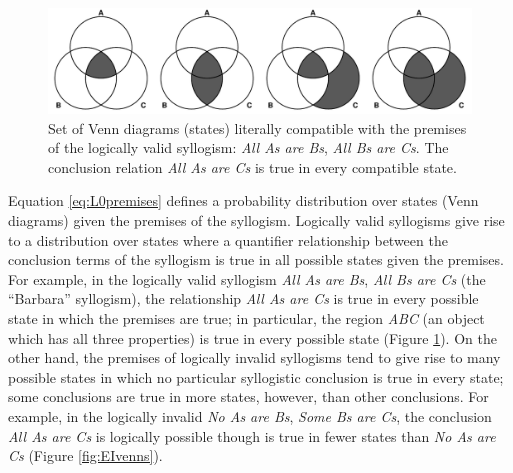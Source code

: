 \documentclass[floatsintext, doc]{apa6}
\begin{document}

\begin{figure}[b]
\centering
\includegraphics[width = \textwidth]{figs/diagrams_allAB_allBC.pdf}
\caption{Set of Venn diagrams (states) literally compatible with the premises of the logically valid syllogism: \emph{All As are Bs}, \emph{All Bs are Cs}. The conclusion relation \emph{All As are Cs} is true in every compatible state.}
\label{fig:AAvenns}
\end{figure}


Equation \ref{eq:L0premises} defines a probability distribution over states (Venn diagrams) given the premises of the syllogism. 
Logically valid syllogisms give rise to a distribution over states where a quantifier relationship between the conclusion terms of the syllogism is true in all possible states given the premises. 
For example, in the logically valid syllogism  \emph{All As are Bs}, \emph{All Bs are Cs} (the ``Barbara'' syllogism), the relationship \emph{All As are Cs} is true in every possible state in which the premises are true; in particular, the region \emph{ABC} (an object which has all three properties) is true in every possible state (Figure \ref{fig:AAvenns}).
On the other hand, the premises of logically invalid syllogisms tend to give rise to many possible states in which no particular syllogistic conclusion is true in every state; some conclusions are true in more states, however, than other conclusions.
For example, in the logically invalid \emph{No As are Bs}, \emph{Some Bs are Cs}, the conclusion \emph{All As are Cs} is logically possible though is true in fewer states than \emph{No As are Cs} (Figure \ref{fig:EIvenns}).
\end{document}
